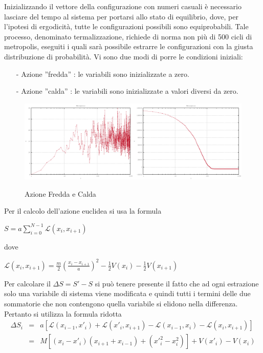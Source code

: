 \documentclass[a4paper,11pt]{report}
\begin{document}
Inizializzando il vettore della configurazione con numeri casuali è necessario lasciare del tempo al sistema per portarsi allo stato di equilibrio, dove, per l'ipotesi di ergodicità, tutte le configurazioni possibili sono equiprobabili. Tale processo, denominato termalizzazione, richiede di norma non più di 500 cicli di metropolis, eseguiti i quali sarà possibile estrarre le configurazioni con la giusta distribuzione di probabilità. Vi sono due modi di porre le condizioni iniziali:
\begin{itemize}
   \small
   \item[-] Azione ''fredda'' : le variabili sono inizializzate a zero.
   \item[-] Azione ''calda'' : le variabili sono inizializzate a valori diversi da zero.
\end{itemize}
\begin{figure}[h]
\centering
\includegraphics[width=0.5\textwidth]{action1}\includegraphics[width=0.5\textwidth]{action2}
\caption{Azione Fredda e Calda}
\label{fig:action}
\end{figure}
Per il calcolo dell'azione euclidea si usa la formula
\begin{center}$S = a\displaystyle\sum\limits_{i=0}^{N-1} \mathcal{L}(x_{i},x_{i+1})$\end{center}
dove
\begin{center}$\mathcal{L}(x_{i},x_{i+1}) = \frac{m}{2}\left(\frac{x_{i}-x_{i+1}}{a}\right)^{2}-\frac{1}{2}V(x_{i})-\frac{1}{2}V(x_{i+1})$\end{center}
Per calcolare il $\Delta S = S'-S$ si può tenere presente il fatto che ad ogni estrazione solo una variabile di sistema viene modificata e quindi tutti i termini delle due sommatorie che non contengono quella variabile si elidono nella differenza. Pertanto si utilizza la formula ridotta
\begin{eqnarray*}
 \Delta S_i &=& a[\mathcal{L}(x_{i-1},x'_{i})+\mathcal{L}(x'_{i},x_{i+1})-\mathcal{L}(x_{i-1},x_{i})-\mathcal{L}(x_{i},x_{i+1})]\\
   &=& M[(x_{i}-x'_{i})(x_{i+1}+x_{i-1})+(x'^2_i-x^2_i)]+V(x'_i)-V(x_i)
\end{eqnarray*}
\end{document}
